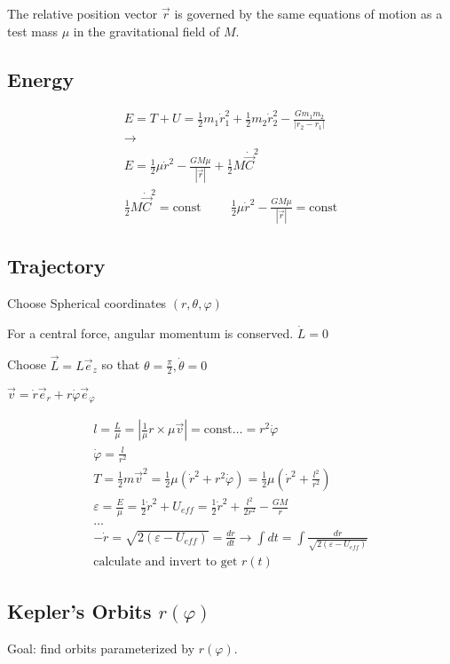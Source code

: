 \documentclass[fleqn]{report}
\newcommand{\hp}{\hspace{1cm}}
\newcommand{\const}{\textrm{const}}
\newcommand{\equations} [1] {
\begin{gather*}
#1
\end{gather*}
}
\begin{document}
The relative position vector $\vec r$ is governed by the same equations of motion 
as a test mass $\mu$ in the gravitational field of $M$.

\subsection{Energy}
\equations{
    E = T + U =
    \frac{1}{2} m_1 \dot r_1^2 + \frac{1}{2} m_2 \dot r_2^2 - 
    \frac{G m_1 m_2}{|r_2 - r_1|}
    \\
    \rightarrow 
    \\
    E = 
    \frac{1}{2} \mu \dot r^2 - \frac{GM \mu}{|\vec r|} + 
    \frac{1}{2} M \dot {\vec C}^2
    \\
    \frac{1}{2} M \dot {\vec C}^2 = \const
    \hp
    \frac{1}{2} \mu \dot r^2 - \frac{GM \mu}{|\vec r|} = \const
}

\subsection{Trajectory}
Choose Spherical coordinates $(r, \theta, \varphi)$

For a central force, angular momentum is conserved. $\dot L = 0$

Choose $\vec L = L \vec e_z$ so that $\theta = \frac{\pi}{2}, \dot \theta = 0$

$\vec v = \dot r \vec e_r + r \dot \varphi \vec e_\varphi$

\equations{
    l = \frac{L}{\mu} = |\frac{1}{\mu} r \times \mu \vec v| = \const
    \ldots = r^2 \dot \varphi 
    \\
    \dot \varphi = \frac{l}{r^2}
    \\
    T = \frac{1}{2} m {\vec v}^2 = \frac{1}{2} \mu (\dot r^2 + r^2 \dot \varphi)
    =
    \frac{1}{2} \mu (\dot r^2 + \frac{l^2}{r^2})
    \\
    \varepsilon = \frac{E}{\mu} = \frac{1}{2} \dot r^2 + U_{eff} = 
    \frac{1}{2} \dot r^2 + \frac{l^2}{2r^2} - \frac{GM}{r}
    \\
    \ldots 
    \\
    - \dot r = \sqrt{2 (\varepsilon - U_{eff})} = \frac{dr}{dt}
    \rightarrow 
    \int dt = \int \frac{dr}{\sqrt{2 (\varepsilon - U_{eff})}}
    \\
    \textrm{calculate and invert to get $r(t)$}
}

\subsection{Kepler's Orbits $r(\varphi)$}
Goal: find orbits parameterized by $r(\varphi)$. 
\end{document}
